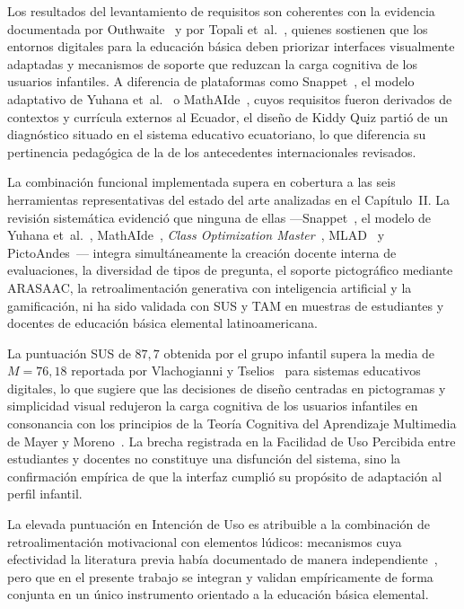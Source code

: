 Los resultados del levantamiento de requisitos son coherentes con la evidencia
documentada por Outhwaite~\cite{outhwaite2022apps} y por Topali
et~al.~\cite{topali2025aied}, quienes sostienen que los entornos digitales para
la educación básica deben priorizar interfaces visualmente adaptadas y
mecanismos de soporte que reduzcan la carga cognitiva de los usuarios
infantiles. A diferencia de plataformas como Snappet~\cite{faber2017dfa}, el
modelo adaptativo de Yuhana et~al.~\cite{yuhana2024adaptive} o
MathAIde~\cite{rodrigues2025mathaide}, cuyos requisitos fueron derivados de
contextos y currícula externos al Ecuador, el diseño de Kiddy Quiz partió de un
diagnóstico situado en el sistema educativo ecuatoriano, lo que diferencia su
pertinencia pedagógica de la de los antecedentes internacionales revisados.

La combinación funcional implementada supera en cobertura a las seis
herramientas representativas del estado del arte analizadas en el
Capítulo~II. La revisión sistemática evidenció que ninguna de ellas
---Snappet~\cite{faber2017dfa,molenaar2016snappet}, el modelo de Yuhana
et~al.~\cite{yuhana2024adaptive}, MathAIde~\cite{rodrigues2025mathaide},
\textit{Class Optimization Master}~\cite{zheng2023genai},
MLAD~\cite{mohseni2025mlad} y PictoAndes~\cite{carriontoro2025pictoandes}---
integra simultáneamente la creación docente interna de evaluaciones, la
diversidad de tipos de pregunta, el soporte pictográfico mediante ARASAAC, la
retroalimentación generativa con inteligencia artificial y la gamificación, ni
ha sido validada con SUS y TAM en muestras de estudiantes y docentes de
educación básica elemental latinoamericana.

La puntuación SUS de $87{,}7$ obtenida por el grupo infantil supera la media de
$M=76{,}18$ reportada por Vlachogianni y Tselios~\cite{vlachogianni2022sus}
para sistemas educativos digitales, lo que sugiere que las decisiones de diseño
centradas en pictogramas y simplicidad visual redujeron la carga cognitiva de
los usuarios infantiles en consonancia con los principios de la Teoría Cognitiva
del Aprendizaje Multimedia de Mayer y Moreno~\cite{mayer2003multimedia}. La
brecha registrada en la Facilidad de Uso Percibida entre estudiantes y docentes
no constituye una disfunción del sistema, sino la confirmación empírica de que
la interfaz cumplió su propósito de adaptación al perfil infantil.

La elevada puntuación en Intención de Uso es atribuible a la combinación de
retroalimentación motivacional con elementos lúdicos: mecanismos cuya
efectividad la literatura previa había documentado de manera
independiente~\cite{topali2025aied,mousavinasab2018its,kiili2018}, pero que en
el presente trabajo se integran y validan empíricamente de forma conjunta en un
único instrumento orientado a la educación básica elemental.

